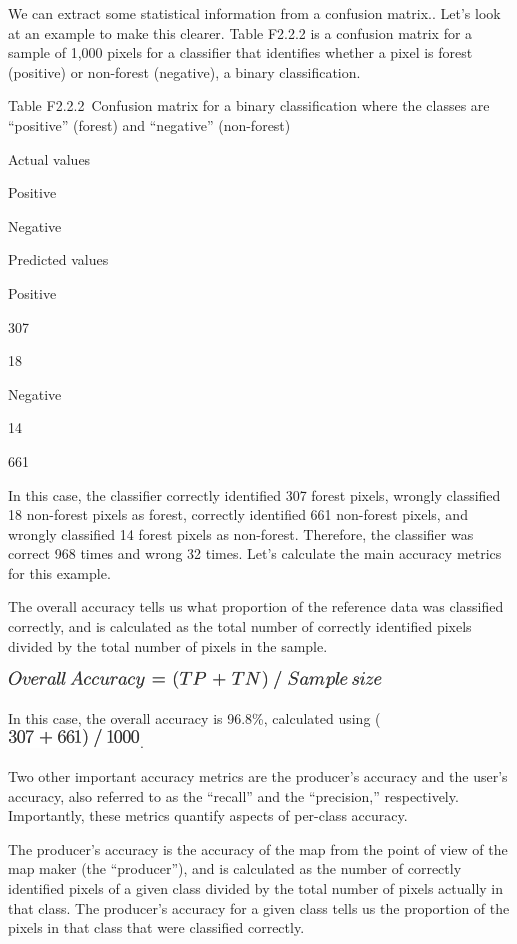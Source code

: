 \documentclass[
  letterpaper,
  DIV=11,
  numbers=noendperiod]{scrreprt}
\begin{document}
We can extract some statistical information from a confusion matrix..
Let's look at an example to make this clearer. Table F2.2.2 is a
confusion matrix for a sample of 1,000 pixels for a classifier that
identifies whether a pixel is forest (positive) or non-forest
(negative), a binary classification.

Table F2.2.2~Confusion matrix for a binary classification where the
classes are ``positive'' (forest) and ``negative'' (non-forest)

Actual values

Positive

Negative

Predicted values

Positive

307

18

Negative

14

661

In this case, the classifier correctly identified 307 forest pixels,
wrongly classified 18 non-forest pixels as forest, correctly identified
661 non-forest pixels, and wrongly classified 14 forest pixels as
non-forest. Therefore, the classifier was correct 968 times and wrong 32
times. Let's calculate the main accuracy metrics for this example.

The overall accuracy tells us what proportion of the reference data was
classified correctly, and is calculated as the total number of correctly
identified pixels divided by the total number of pixels in the sample.

\includegraphics{./F2/image6.png}

In this case, the overall accuracy is 96.8\%, calculated using
(\includegraphics{./F2/image7.png}.

Two other important accuracy metrics are the producer's accuracy and the
user's accuracy, also referred to as the ``recall'' and the
``precision,'' respectively. Importantly, these metrics quantify aspects
of per-class accuracy.

The producer's accuracy is the accuracy of the map from the point of
view of the map maker (the ``producer''), and is calculated as the
number of correctly identified pixels of a given class divided by the
total number of pixels actually in that class. The producer's accuracy
for a given class tells us the proportion of the pixels in that class
that were classified correctly.
\end{document}

